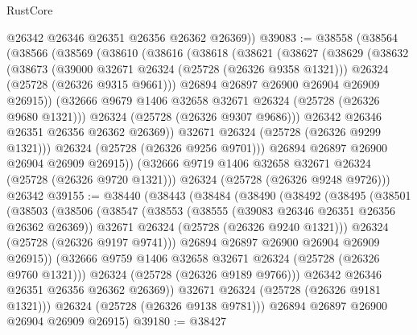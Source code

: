 \begin{lexlean}{RustCore}
\begin{coremodule}
        @26342
        @26346
        @26351
        @26356
        @26362
        @26369))
@39083 := @38558
    (@38564
      (@38566
        (@38569
          (@38610
            (@38616
              (@38618
                (@38621
                  (@38627
                    (@38629
                      (@38632
                        (@38673
                          (@39000 @32671 @26324 (@25728 (@26326 @9358 @1321)))
                          @26324
                          (@25728 (@26326 @9315 @9661)))
                        @26894
                        @26897
                        @26900
                        @26904
                        @26909
                        @26915))
                    (@32666 @9679 @1406 @32658 @32671 @26324 (@25728 (@26326 @9680 @1321)))
                    @26324
                    (@25728 (@26326 @9307 @9686)))
                  @26342
                  @26346
                  @26351
                  @26356
                  @26362
                  @26369))
              @32671
              @26324
              (@25728 (@26326 @9299 @1321)))
            @26324
            (@25728 (@26326 @9256 @9701)))
          @26894
          @26897
          @26900
          @26904
          @26909
          @26915))
      (@32666 @9719 @1406 @32658 @32671 @26324 (@25728 (@26326 @9720 @1321)))
      @26324
      (@25728 (@26326 @9248 @9726)))
    @26342
@39155 := @38440
    (@38443
      (@38484
        (@38490
          (@38492
            (@38495
              (@38501
                (@38503
                  (@38506
                    (@38547
                      (@38553
                        (@38555 (@39083 @26346 @26351 @26356 @26362 @26369))
                        @32671
                        @26324
                        (@25728 (@26326 @9240 @1321)))
                      @26324
                      (@25728 (@26326 @9197 @9741)))
                    @26894
                    @26897
                    @26900
                    @26904
                    @26909
                    @26915))
                (@32666 @9759 @1406 @32658 @32671 @26324 (@25728 (@26326 @9760 @1321)))
                @26324
                (@25728 (@26326 @9189 @9766)))
              @26342
              @26346
              @26351
              @26356
              @26362
              @26369))
          @32671
          @26324
          (@25728 (@26326 @9181 @1321)))
        @26324
        (@25728 (@26326 @9138 @9781)))
      @26894
      @26897
      @26900
      @26904
      @26909
      @26915)
@39180 := @38427

\end{coremodule}
\end{lexlean}
